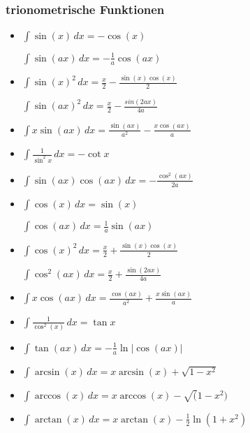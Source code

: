 \subsubsection{trionometrische Funktionen}
\begin{itemize}[leftmargin=*]
	\item
	\begin{minipage}{0.5\columnwidth}
		$\int \sin(x) \, dx = - \cos(x)$
	\end{minipage}
	\begin{minipage}{0.45\columnwidth}
		$\int \sin(ax) \,dx = -\frac{1}{a}\cos(ax)$
	\end{minipage}

	\item
	\begin{minipage}{0.5\columnwidth}
		 $\int \sin(x)^2 \, dx = \frac{x}{2} - \frac{\sin(x) \cos(x)}{2}$
	\end{minipage}
	\begin{minipage}{0.45\columnwidth}
		$\int \sin(ax)^2 \,dx = \frac{x}{2} - \frac{sin(2ax)}{4a}$
	\end{minipage}
		  
	\item $\int x \sin(ax) \,dx = \frac{\sin(ax)}{a^2} - \frac{x \cos(ax)}{a}$
	\item $\int \frac{1}{\sin^2 x} \,dx = -\cot x$
   	\item $\int \sin(ax) \cos(ax) \,dx = -\frac{\cos^2(ax)}{2a}$

   	\item 
	\begin{minipage}{0.5\columnwidth}
		$\int \cos(x) \, dx = \sin(x)$
	\end{minipage}
	\begin{minipage}{0.45\columnwidth}
		$\int \cos(ax) \,dx = \frac{1}{a}\sin(ax)$
	\end{minipage}

	\item
	\begin{minipage}{0.5\columnwidth}
		$\int \cos(x)^2 \, dx = \frac{x}{2} + \frac{\sin(x) \cos(x)}{2}$
	\end{minipage}
	\begin{minipage}{0.45\columnwidth}
		$\int \cos^2(ax) \,dx = \frac{x}{2} + \frac{\sin(2ax)}{4a}$
	\end{minipage}
	\item $\int x \cos(ax) \,dx = \frac{\cos(ax)}{a^2} + \frac{x \sin(ax)}{a}$
	\item $\int \frac{1}{\cos^2(x)} \,dx = \tan x$
	
	\item $\int \tan(ax) \,dx = - \frac{1}{a} \ln | \cos(ax) |$
	\item $\int \arcsin(x) \,dx = x \arcsin(x) + \sqrt{1 - x^2}$
	\item $\int \arccos(x) \,dx = x \arccos(x) - \sqrt(1-x^2)$
	\item $\int \arctan(x) \,dx = x \arctan(x) - \frac{1}{2} \ln(1+x^2)$
\end{itemize}

